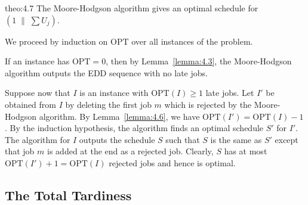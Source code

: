 \begin{theo}{theo:4.7}
    The Moore-Hodgson algorithm gives an optimal schedule for 
    $(1\;\|\;\sum U_j)$. 
\end{theo}
\begin{pf}
    We proceed by induction on $\text{OPT}$ over all instances of the problem. 

    If an instance has $\text{OPT} = 0$, then by Lemma~\ref{lemma:4.3}, the 
    Moore-Hodgson algorithm outputs the EDD sequence with no late jobs. 

    Suppose now that $I$ is an instance with $\text{OPT}(I) \geq 1$ late 
    jobs. Let $I'$ be obtained from $I$ by deleting the first job $m$ 
    which is rejected by the Moore-Hodgson algorithm. By Lemma~\ref{lemma:4.6}, 
    we have $\text{OPT}(I') = \text{OPT}(I) - 1$. By the induction hypothesis, 
    the algorithm finds an optimal schedule $S'$ for $I'$. The algorithm 
    for $I$ outputs the schedule $S$ such that $S$ is the same as $S'$ 
    except that job $m$ is added at the end as a rejected job. Clearly, 
    $S$ has at most $\text{OPT}(I') + 1 = \text{OPT}(I)$ rejected jobs 
    and hence is optimal. 
\end{pf}

\subsection{The Total Tardiness} \label{subsec:4.3}
